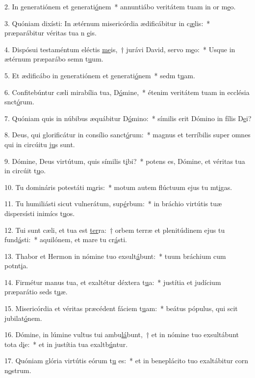 2. In generatiónem et generati\uline{ó}nem~* annuntiábo veritátem tuam in or m\uline{e}o.\par 
3. Quóniam dixísti: In ætérnum misericórdia ædificábitur in c\uline{æ}lis:~* præparábitur véritas tua n \uline{e}is.\par 
4. Dispósui testaméntum eléctis \uline{me}is,~† jurávi David, servo m\uline{e}o:~* Usque in ætérnum præparábo semn t\uline{u}um.\par 
5. Et ædificábo in generatiónem et generati\uline{ó}nem~* sedm t\uline{u}am.\par 
6. Confitebúntur cæli mirabília tua, D\uline{ó}mine,~* étenim veritátem tuam in ecclésia snct\uline{ó}rum.\par 
7. Quóniam quis in núbibus æquábitur D\uline{ó}mino:~* símilis erit Dómino in fílis D\uline{e}i?\par 
8. Deus, qui glorificátur in consílio sanct\uline{ó}rum:~* magnus et terríbilis super omnes qui in circúitu j\uline{u}s sunt.\par 
9. Dómine, Deus virtútum, quis símilis t\uline{i}bi?~* potens es, Dómine, et véritas tua in circúit t\uline{u}o.\par 
10. Tu domináris potestáti m\uline{a}ris:~* motum autem flúctuum ejus tu mt\uline{i}gas.\par 
11. Tu humiliásti sicut vulnerátum, sup\uline{é}rbum:~* in bráchio virtútis tuæ dispersísti inimícs t\uline{u}os.\par 
12. Tui sunt cæli, et tua est \uline{ter}ra:~† orbem terræ et plenitúdinem ejus tu fund\uline{á}sti:~* aquilónem, et mare tu cr\uline{á}sti.\par 
13. Thabor et Hermon in nómine tuo exsult\uline{á}bunt:~* tuum bráchium cum potnt\uline{i}a.\par 
14. Firmétur manus tua, et exaltétur déxtera t\uline{u}a:~* justítia et judícium præparátio seds t\uline{u}æ.\par 
15. Misericórdia et véritas præcédent fáciem t\uline{u}am:~* beátus pópulus, qui scit jubilat\uline{ó}nem.\par 
16. Dómine, in lúmine vultus tui ambu\uline{lá}bunt,~† et in nómine tuo exsultábunt tota d\uline{i}e:~* et in justítia tua exaltb\uline{ú}ntur.\par 
17. Quóniam glória virtútis eórum t\uline{u} es:~* et in beneplácito tuo exaltábitur corn n\uline{o}strum.\par 
